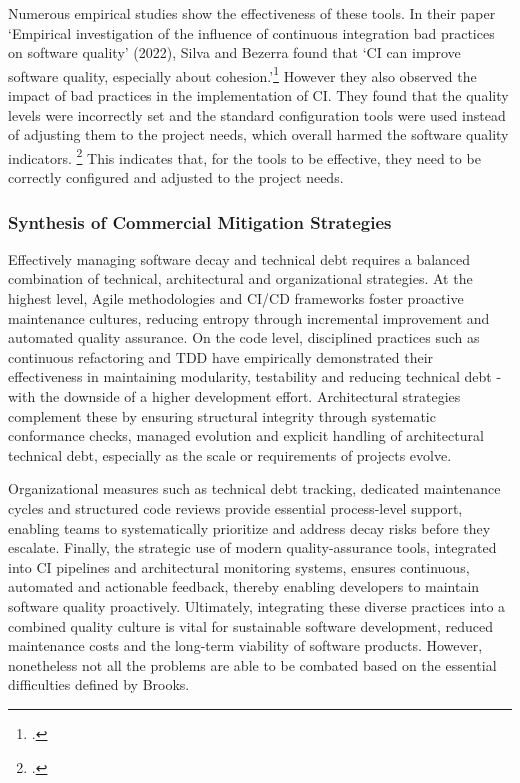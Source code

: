 Numerous empirical studies show the effectiveness of these tools. In their paper `Empirical investigation of the influence of continuous integration bad practices on software quality' (2022),
Silva and Bezerra found that `CI can improve software quality, especially about cohesion.'\footcite[4]{silvaEmpiricalInvestigationInfluence2022} However they also observed the impact
of bad practices in the implementation of CI. They found that the quality levels were incorrectly set and the standard configuration tools were used instead of 
adjusting them to the project needs, which overall harmed the software quality indicators. \footcite[4]{silvaEmpiricalInvestigationInfluence2022}
This indicates that, for the tools to be effective, they need to be correctly configured and adjusted to the project needs.\\

\subsubsection{Synthesis of Commercial Mitigation Strategies}
Effectively managing software decay and technical debt requires a balanced combination of technical, architectural and organizational strategies.
At the highest level, Agile methodologies and \ac{CI/CD} frameworks foster proactive maintenance cultures, reducing entropy through incremental improvement
and automated quality assurance. On the code level, disciplined practices such as continuous refactoring and \ac{TDD} have empirically demonstrated their effectiveness
in maintaining modularity, testability and reducing technical debt - with the downside of a higher development effort. Architectural strategies complement these
by ensuring structural integrity through systematic conformance checks, managed evolution and explicit handling of architectural technical debt, especially as
the scale or requirements of projects evolve.

Organizational measures such as technical debt tracking, dedicated maintenance cycles and structured code reviews provide essential process-level support,
enabling teams to systematically prioritize and address decay risks before they escalate. Finally, the strategic use of modern quality-assurance tools, integrated
into \ac{CI} pipelines and architectural monitoring systems, ensures continuous, automated and actionable feedback, thereby enabling developers to maintain
software quality proactively. Ultimately, integrating these diverse practices into a combined quality culture is vital for sustainable software development,
reduced maintenance costs and the long-term viability of software products. However, nonetheless not all the problems are able to be combated based on the essential difficulties defined by Brooks.\\


